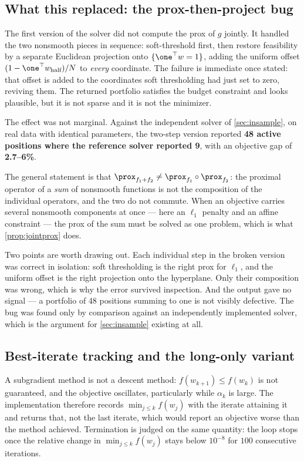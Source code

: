 \subsection{What this replaced: the prox-then-project bug}\label{sec:proxbug}

The first version of the solver did not compute the prox of $g$ jointly. It handled the two
nonsmooth pieces in sequence: soft-threshold first, then restore feasibility by a separate
Euclidean projection onto $\{\one^\top w = 1\}$, adding the uniform offset
$(1 - \one^\top w_{\text{half}})/N$ to \emph{every} coordinate. The failure is immediate once
stated: that offset is added to the coordinates soft thresholding had just set to zero,
reviving them. The returned portfolio satisfies the budget constraint and looks plausible, but
it is not sparse and it is not the minimizer.

The effect was not marginal. Against the independent solver of \cref{sec:insample}, on real
data with identical parameters, the two-step version reported \textbf{48 active positions where
the reference solver reported 9}, with an objective gap of \textbf{2.7--6\%}.

The general statement is that $\prox_{f_1 + f_2} \neq \prox_{f_1} \circ \prox_{f_2}$: the
proximal operator of a \emph{sum} of nonsmooth functions is not the composition of the
individual operators, and the two do not commute. When an objective carries several nonsmooth
components at once --- here an $\ell_1$ penalty and an affine constraint --- the prox of the sum
must be solved as one problem, which is what \cref{prop:jointprox} does.

Two points are worth drawing out. Each individual step in the broken version was correct in
isolation: soft thresholding is the right prox for $\ell_1$, and the uniform offset is the right
projection onto the hyperplane. Only their composition was wrong, which is why the error
survived inspection. And the output gave no signal --- a portfolio of 48 positions summing to
one is not visibly defective. The bug was found only by comparison against an independently
implemented solver, which is the argument for \cref{sec:insample} existing at all.

\subsection{Best-iterate tracking and the long-only variant}

A subgradient method is not a descent method: $f(w_{k+1}) \le f(w_k)$ is not guaranteed, and
the objective oscillates, particularly while $\alpha_k$ is large. The implementation therefore
records $\min_{j \le k} f(w_j)$ with the iterate attaining it and returns that, not the last
iterate, which would report an objective worse than the method achieved. Termination is judged
on the same quantity: the loop stops once the relative change in $\min_{j\le k} f(w_j)$ stays
below $10^{-8}$ for $100$ consecutive iterations.

